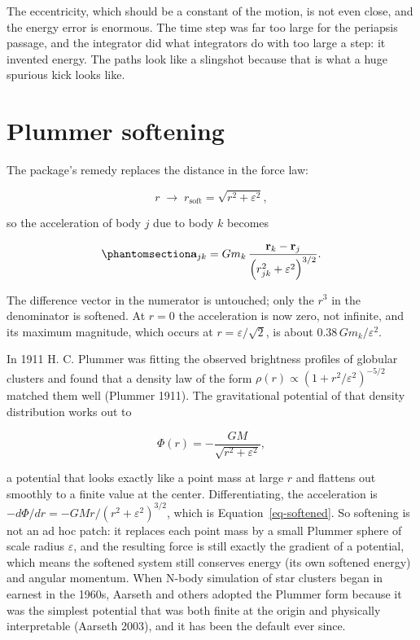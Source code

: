 \documentclass[
  10.5pt,
  letterpaper,
]{scrbook}
\theoremstyle{definition}
\theoremstyle{plain}
\theoremstyle{remark}
\begin{document}
The eccentricity, which should be a constant of the motion, is not even
close, and the energy error is enormous. The time step was far too large
for the periapsis passage, and the integrator did what integrators do
with too large a step: it invented energy. The paths look like a
slingshot because that is what a huge spurious kick looks like.

\section{Plummer softening}\label{plummer-softening}

The package's remedy replaces the distance in the force law:

\[
r \;\longrightarrow\; r_{\mathrm{soft}} = \sqrt{r^2 + \varepsilon^2},
\]

so the acceleration of body \(j\) due to body \(k\) becomes

\begin{equation}\protect\phantomsection\label{eq-softened}{
\mathbf{a}_{jk} = G m_k \,\frac{\mathbf{r}_k - \mathbf{r}_j}{\left(r_{jk}^2 + \varepsilon^2\right)^{3/2}}.
}\end{equation}

The difference vector in the numerator is untouched; only the \(r^3\) in
the denominator is softened. At \(r = 0\) the acceleration is now zero,
not infinite, and its maximum magnitude, which occurs at
\(r = \varepsilon/\sqrt2\), is about \(0.38\,G m_k/\varepsilon^2\).

\begin{tcolorbox}[enhanced jigsaw, arc=.35mm, bottomrule=.15mm, bottomtitle=1mm, breakable, colback=white, colbacktitle=quarto-callout-note-color!10!white, colframe=quarto-callout-note-color-frame, coltitle=black, left=2mm, leftrule=.75mm, opacityback=0, opacitybacktitle=0.6, rightrule=.15mm, title={Where it comes from}, titlerule=0mm, toprule=.15mm, toptitle=1mm]

In 1911 H. C. Plummer was fitting the observed brightness profiles of
globular clusters and found that a density law of the form
\(\rho(r) \propto (1 + r^2/\varepsilon^2)^{-5/2}\) matched them well
(Plummer 1911). The gravitational potential of that density distribution
works out to

\[
\Phi(r) = -\frac{GM}{\sqrt{r^2 + \varepsilon^2}},
\]

a potential that looks exactly like a point mass at large \(r\) and
flattens out smoothly to a finite value at the center. Differentiating,
the acceleration is \(-d\Phi/dr = -GMr/(r^2+\varepsilon^2)^{3/2}\),
which is Equation~\ref{eq-softened}. So softening is not an ad hoc
patch: it replaces each point mass by a small Plummer sphere of scale
radius \(\varepsilon\), and the resulting force is still exactly the
gradient of a potential, which means the softened system still conserves
energy (its own softened energy) and angular momentum. When N-body
simulation of star clusters began in earnest in the 1960s, Aarseth and
others adopted the Plummer form because it was the simplest potential
that was both finite at the origin and physically interpretable (Aarseth
2003), and it has been the default ever since.

\end{tcolorbox}
\end{document}
